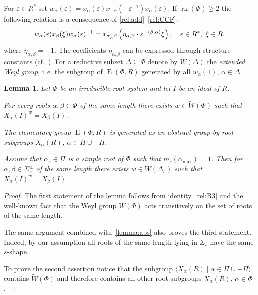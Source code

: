 \documentclass[12pt]{amsart}
\theoremstyle{plain} \declaretheorem[name=Theorem, Refname={Theorem,Theorems}]{thm} \Crefname{thm}{Theorem}{Theorems}
\numberwithin{equation}{section}
\newtheorem{lemma}{Lemma} \numberwithin{lemma}{section} \Crefname{lemma}{Lemma}{Lemmas}
\theoremstyle{definition} \newtheorem{dfn}[lemma]{Definition} \Crefname{dfn}{Definition}{Definitions}
\theoremstyle{remark} \newtheorem{rem}[lemma]{Remark} \Crefname{rem}{Remark}{Remarks}
\DeclareMathOperator{\E}{E}
\DeclareMathOperator{\rk}{rk}
\def\ssub#1{\mathchoice
   {_{\lower2pt\hbox{$\scriptstyle #1$}}}
   {_{\lower2pt\hbox{$\scriptstyle #1$}}}
   {_{\lower1.5pt\hbox{$\scriptscriptstyle #1$}}}
   {_{\!\lower1.5pt\hbox{$\scriptscriptstyle #1$}}}}
\begin{document}
For $\varepsilon\in R^*$ set $w_\alpha(\varepsilon) = x_\alpha(\varepsilon) x_{-\alpha}(-\varepsilon^{-1}) x_{\alpha}(\varepsilon).$
If $\rk(\Phi)\geqslant 2$ the following relation is a consequence of \eqref{rel:add}--\eqref{rel:CCF}:
\begin{equation}\label{rel:R3}
w_\alpha(\varepsilon) x_{\beta}(\xi) w_\alpha(\varepsilon)^{-1} =
x_{\sigma\ssub{\alpha}\beta} \left(\eta_{\alpha, \beta}\cdot\varepsilon^{-\langle\beta,\alpha \rangle}\xi\right),\quad \varepsilon\in R^*,\ \xi\in R.
\end{equation}
where $\eta_{\alpha, \beta}=\pm 1$. The coefficients $\eta_{\alpha, \beta}$ can be expressed through structure constants (cf.~\cite[\S13]{VP}).
For a reductive subset $\Delta \subseteq \Phi$ denote by $\widetilde{W}(\Delta)$ the \emph{extended Weyl group}, i.\,e. the subgroup of $\E(\Phi, R)$ generated by all $w_{\alpha}(1)$, $\alpha \in \Delta$.
\begin{lemma} \label{lemma:weylfacts} Let $\Phi$ be an irreducible root system and let $I$ be an ideal of $R$. 
\begin{lemlist}
\item \label{item-trans1} For every roots $\alpha, \beta \in \Phi$ of the same length there exists $w \in \widetilde{W}(\Phi)$ such that $X_{\alpha}(I)^w = X_\beta(I)$.
\item \label{item-egen} The elementary group $\E(\Phi, R)$  is generated as an abstract group by root subgroups $X_{\alpha}(R)$, $\alpha \in \Pi \cup -\Pi$.
\item \label{item-trans2} Assume that $\alpha_s\in \Pi$ is a simple root of $\Phi$ such that $m_s(\alpha_\mathrm{max}) = 1$. 
                          Then for $\alpha, \beta \in \Sigma^\pm_s$ of the same length there exists $w\in \widetilde{W}(\Delta_s)$ such that $X_\alpha(I)^w = X_\beta(I)$. \end{lemlist}
\end{lemma}
\begin{proof}
The first statement of the lemma follows from identity~\eqref{rel:R3} and the well-known fact that the Weyl group $W(\Phi)$ acts transitively on the set of roots of the same length.
 
The same argument combined with~\cref{lemma:abs} also proves the third statement. Indeed, by our assumption all roots of the same length lying in $\Sigma_s$ have the same $s$-shape.
 
To prove the second assertion notice that the subgroup $\langle X_\alpha(R) \mid \alpha \in \Pi \cup -\Pi \rangle$ contains $\widetilde{W}(\Phi)$ and therefore contains all other root subgroups $X_\alpha(R)$, $\alpha\in \Phi$. \end{proof}
\end{document}

